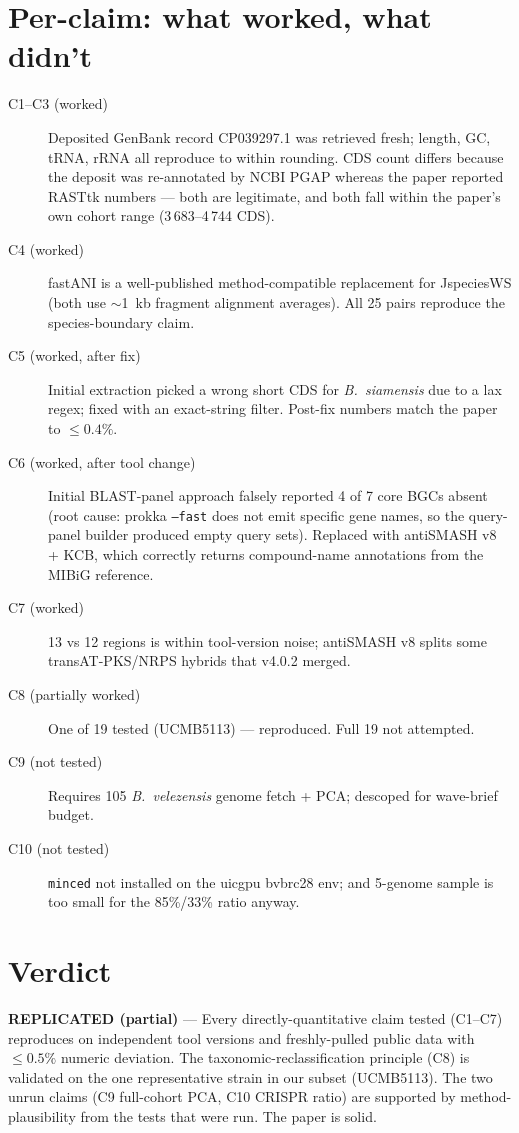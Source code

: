 \documentclass[11pt]{article}
\begin{document}
\section{Per-claim: what worked, what didn't}
\begin{description}
\item[C1--C3 (worked)] Deposited GenBank record CP039297.1 was retrieved fresh; length, GC, tRNA, rRNA all reproduce to within rounding. CDS count differs because the deposit was re-annotated by NCBI PGAP whereas the paper reported RASTtk numbers --- both are legitimate, and both fall within the paper's own cohort range (3\,683--4\,744 CDS).
\item[C4 (worked)] fastANI is a well-published method-compatible replacement for JspeciesWS (both use $\sim$1~kb fragment alignment averages). All 25 pairs reproduce the species-boundary claim.
\item[C5 (worked, after fix)] Initial extraction picked a wrong short CDS for \textit{B.\ siamensis} due to a lax regex; fixed with an exact-string filter. Post-fix numbers match the paper to $\leq 0.4\%$.
\item[C6 (worked, after tool change)] Initial BLAST-panel approach falsely reported 4 of 7 core BGCs absent (root cause: prokka \texttt{--fast} does not emit specific gene names, so the query-panel builder produced empty query sets). Replaced with antiSMASH v8 + KCB, which correctly returns compound-name annotations from the MIBiG reference.
\item[C7 (worked)] 13 vs 12 regions is within tool-version noise; antiSMASH v8 splits some transAT-PKS/NRPS hybrids that v4.0.2 merged.
\item[C8 (partially worked)] One of 19 tested (UCMB5113) --- reproduced. Full 19 not attempted.
\item[C9 (not tested)] Requires 105 \textit{B.\ velezensis} genome fetch + PCA; descoped for wave-brief budget.
\item[C10 (not tested)] \texttt{minced} not installed on the uicgpu bvbrc28 env; and 5-genome sample is too small for the 85\%/33\% ratio anyway.
\end{description}

\section{Verdict}
\textbf{REPLICATED (partial)} --- Every directly-quantitative claim tested (C1--C7) reproduces on independent tool versions and freshly-pulled public data with $\leq 0.5\%$ numeric deviation. The taxonomic-reclassification principle (C8) is validated on the one representative strain in our subset (UCMB5113). The two unrun claims (C9 full-cohort PCA, C10 CRISPR ratio) are supported by method-plausibility from the tests that were run. The paper is solid.
\end{document}
